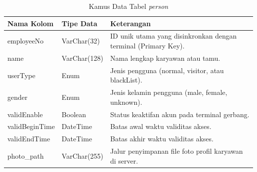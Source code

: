 \begin{table}[t]
    \centering
    \caption{Kamus Data Tabel \textit{person}}
    \label{tab:kamus_person}
    \begin{tabular}{|l|l|p{8cm}|}
        \hline
        \textbf{Nama Kolom} & \textbf{Tipe Data} & \textbf{Keterangan} \\
        \hline
        employeeNo & VarChar(32) & ID unik utama yang disinkronkan dengan terminal (Primary Key). \\
        \hline
        name & VarChar(128) & Nama lengkap karyawan atau tamu. \\
        \hline
        userType & Enum & Jenis pengguna (normal, visitor, atau blackList). \\
        \hline
        gender & Enum & Jenis kelamin pengguna (male, female, unknown). \\
        \hline
        validEnable & Boolean & Status keaktifan akun pada terminal gerbang. \\
        \hline
        validBeginTime & DateTime & Batas awal waktu validitas akses. \\
        \hline
        validEndTime & DateTime & Batas akhir waktu validitas akses. \\
        \hline
        photo\_path & VarChar(255) & Jalur penyimpanan file foto profil karyawan di server. \\
        \hline
    \end{tabular}
\end{table}